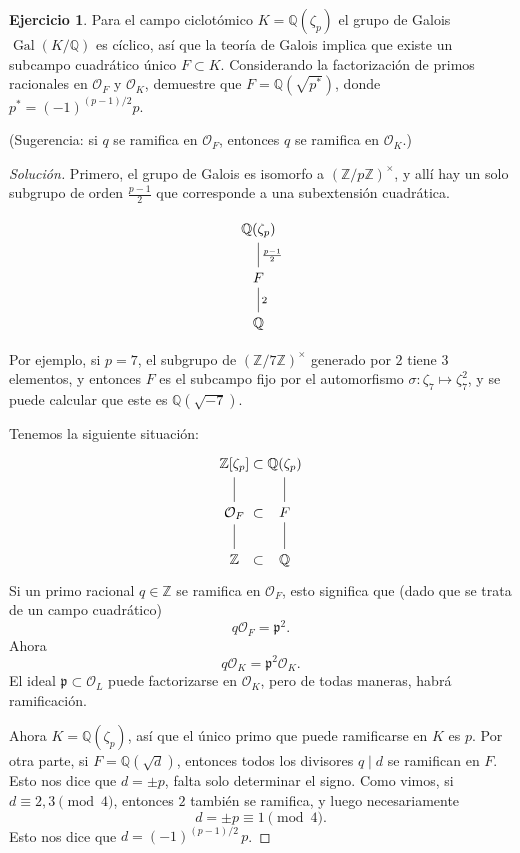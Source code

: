 \documentclass{article}
\newcounter{tarea}
\theoremstyle{definition}
\newtheorem{ejercicio}{Ejercicio}[tarea]
\newenvironment{solucion}{\begin{proof}[Solución]}{\end{proof}}
\newcommand{\ZZ}{\mathbb{Z}}
\newcommand{\QQ}{\mathbb{Q}}
\renewcommand{\O}{\mathcal{O}}
\DeclareMathOperator{\Gal}{Gal}
\begin{document}
\begin{ejercicio}
  Para el campo ciclotómico $K = \QQ (\zeta_p)$ el grupo de Galois
  $\Gal (K/\QQ)$ es cíclico, así que la teoría de Galois
  implica que existe un subcampo cuadrático único $F \subset K$. Considerando
  la factorización de primos racionales en $\O_F$ y $\O_K$,
  demuestre que $F = \QQ (\sqrt{p^*})$, donde $p^* = (-1)^{(p-1)/2} p$.

  \noindent (Sugerencia: si $q$ se ramifica en $\O_F$, entonces $q$ se
  ramifica en $\O_K$.)

  \ifdefined\solutions
  \begin{solucion}
    Primero, el grupo de Galois es isomorfo a $(\ZZ/p\ZZ)^\times$, y allí hay un
    solo subgrupo de orden $\frac{p-1}{2}$ que corresponde a una subextensión
    cuadrática.

    \[ \begin{tikzcd}
      \QQ (\zeta_p) \ar[-]{d}{\frac{p-1}{2}} \\
      F \ar[-]{d}{2} \\
      \QQ
    \end{tikzcd} \]

    Por ejemplo, si $p = 7$, el subgrupo de $(\ZZ/7\ZZ)^\times$ generado por $2$
    tiene $3$ elementos, y entonces $F$ es el subcampo fijo por el automorfismo
    $\sigma\colon \zeta_7 \mapsto \zeta_7^2$, y se puede calcular que este es
    $\QQ (\sqrt{-7})$.

    Tenemos la siguiente situación:
    \[ \begin{tikzcd}
      \ZZ [\zeta_p]\ar[-]{d} &[-3em] \subset &[-3em] \QQ (\zeta_p)\ar[-]{d} \\
      \O_F\ar[-]{d} & \subset & F\ar[-]{d} \\
      \ZZ & \subset & \QQ
    \end{tikzcd} \]
    Si un primo racional $q \in \ZZ$ se ramifica en $\O_F$, esto significa que
    (dado que se trata de un campo cuadrático)
    $$q \O_F = \mathfrak{p}^2.$$
    Ahora
    $$q \O_K = \mathfrak{p}^2 \O_K.$$
    El ideal $\mathfrak{p} \subset \O_L$ puede factorizarse en $\O_K$, pero de
    todas maneras, habrá ramificación.

    Ahora $K = \QQ (\zeta_p)$, así que el único primo que puede ramificarse en
    $K$ es $p$. Por otra parte, si $F = \QQ (\sqrt{d})$, entonces todos los
    divisores $q \mid d$ se ramifican en $F$. Esto nos dice que $d = \pm p$,
    falta solo determinar el signo. Como vimos, si $d \equiv 2,3 \pmod{4}$,
    entonces $2$ también se ramifica, y luego necesariamente
    $$d = \pm p \equiv 1 \pmod{4}.$$
    Esto nos dice que $d = (-1)^{(p-1)/2}\,p$.


\end{solucion}
\end{ejercicio}
\end{document}
